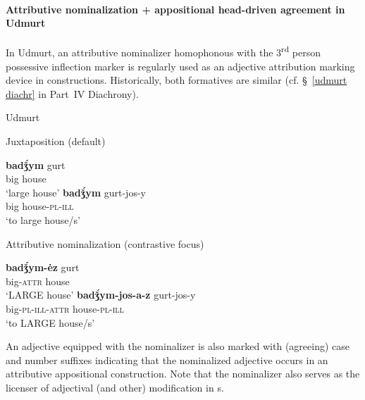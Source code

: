 \paragraph*{Attributive nominalization + appositional head\hyp{}driven agreement in Udmurt}
\label{udmurt synchr}
In Udmurt, an attributive nominalizer homophonous with the 3\textsuperscript{rd} person possessive inflection marker is regularly used as an adjective attribution marking device in  constructions. Historically, both formatives are similar (cf. \S~\ref{udmurt diachr} in Part~IV Diachrony).
\begin{exe}
\ex \rm{Udmurt \citep{winkler2001}}
\begin{xlist}
\ex \rm{Juxtaposition (default)}
\begin{xlist}
\ex
\gll	\textbf{badǯ́ym} gurt\\
	big house\\
\glt	‘large house’
\ex	
\gll	\textbf{badǯ́ym} gurt-jos-y\\
	big house-\textsc{pl}-\textsc{ill}\\
\glt	‘to large house/s’
\end{xlist}
\ex \rm{Attributive nominalization (contrastive focus)}
\begin{xlist}
\ex
\gll	\textbf{badǯ́ym-ėz} gurt\\
	big-\textsc{attr} house\\
\glt	‘LARGE house’
\ex	
\gll	\textbf{badǯ́ym-jos-a-z} gurt-jos-y\\
	big-\textsc{pl}-\textsc{ill}-\textsc{attr} house-\textsc{pl}-\textsc{ill}\\
\glt	‘to LARGE house/s’
\end{xlist}
\end{xlist}
\end{exe}
An adjective equipped with the nominalizer is also marked with (agreeing) case and number suffixes indicating that the nominalized adjective occurs in an attributive appositional construction. Note that the nominalizer also serves as the licenser of adjectival (and other) modification in s.
